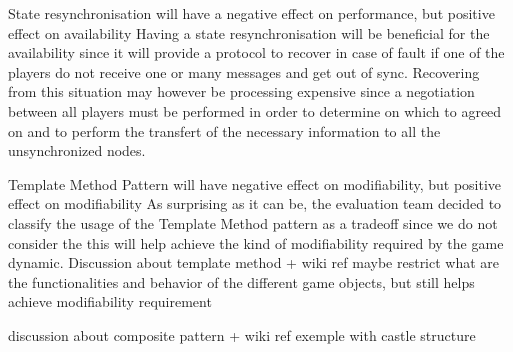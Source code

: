 
\begin{description}[style=nextline]
  \item[T1\label{t1}] State resynchronisation will have a negative effect on performance, but positive effect on availability
    \vspace{\baselineskip}
    \newline
    Having a state resynchronisation will be beneficial for the availability since it will provide a protocol to recover in case of fault if one of the players do not receive one or many messages and get out of sync. Recovering from this situation may however be processing expensive since a negotiation between all players must be performed in order to determine on which to agreed on and to perform the transfert of the necessary information to all the unsynchronized nodes.

  \item[T2\label{t2}] Template Method Pattern will have negative effect on modifiability, but positive effect on modifiability
    \vspace{\baselineskip}
    \newline
    As surprising as it can be, the evaluation team decided to classify the usage of the Template Method pattern as a tradeoff since we do not consider the this will help achieve the kind of modifiability required by the game dynamic.
    \newline
    \vspace{\baselineskip}
    Discussion about template method + wiki ref
    maybe restrict what are the functionalities and behavior of the different game objects, but still helps achieve modifiability requirement

    discussion about composite pattern + wiki ref exemple with castle structure
\end{description}

